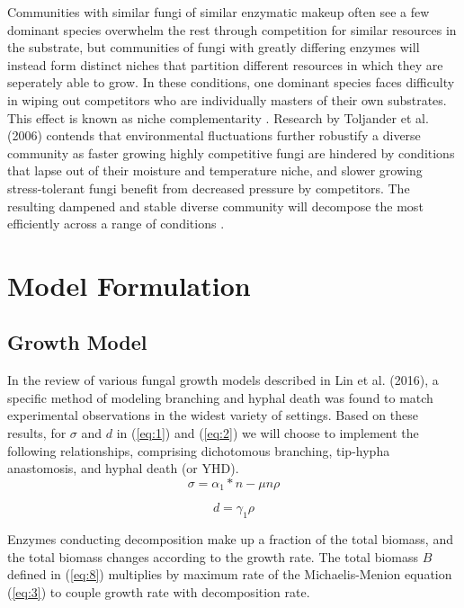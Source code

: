 \documentclass[12pt]{article}
\begin{document}
\begin{multicols}{2}
Communities with similar fungi of similar enzymatic makeup often see a few dominant species overwhelm the rest through competition for similar resources in the substrate, but communities of fungi with greatly differing enzymes will instead form distinct niches that partition different resources in which they are seperately able to grow. In these conditions, one dominant species faces difficulty in wiping out competitors who are individually masters of their own substrates. This effect is known as niche complementarity \cite{Toljander2006}. Research by Toljander et al. (2006) contends that environmental fluctuations further robustify a diverse community as faster growing highly competitive fungi are hindered by conditions that lapse out of their moisture and temperature niche, and slower growing stress-tolerant fungi benefit from decreased pressure by competitors. The resulting dampened and stable diverse community will decompose the most efficiently across a range of conditions \cite{Toljander2006}.

\section{Model Formulation}


\subsection{Growth Model}
In the review of various fungal growth models described in Lin et al. (2016), a specific method of modeling branching and hyphal death was found to match experimental observations in the widest variety of settings. Based on these results, for $\sigma$ and $d$ in (\ref{eq:1}) and (\ref{eq:2}) we will choose to implement the following relationships, comprising dichotomous branching, tip-hypha anastomosis, and hyphal death (or YHD). 
\begin{equation} 
\sigma = \alpha_{1}*n - \mu n \rho
\end{equation}

\begin{equation}
d = \gamma_{1}\rho
\end{equation}

Enzymes conducting decomposition make up a fraction of the total biomass, and the total biomass changes according to the growth rate. The total biomass $B$ defined in (\ref{eq:8}) multiplies by maximum rate of the Michaelis-Menion equation (\ref{eq:3}) to couple growth rate with decomposition rate. 


\end{multicols}
\end{document}
